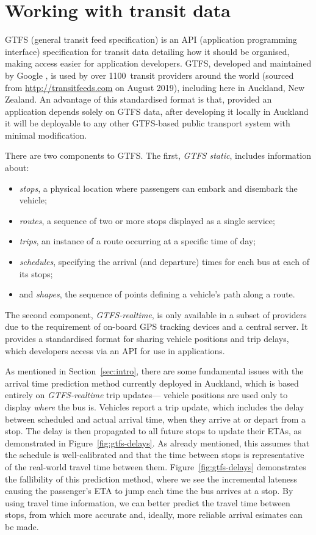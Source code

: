 \section{Working with \rt transit data}
\label{sec:gtfs}


GTFS (general transit feed specification)
is an API (application programming interface) specification for transit data
detailing how it should be organised,
making access easier for application developers.
GTFS, developed and maintained by Google \citep{GoogleDevelopers_2006},
is used by over 1100~transit providers around the world
(sourced from \url{http://transitfeeds.com} on August 2019),
including here in Auckland, New Zealand.
An advantage of this standardised format is that,
provided an application depends solely on GTFS data,
after developing it locally in Auckland it will be deployable to any other GTFS-based
public transport system with minimal modification.


There are two components to GTFS.
The first, \emph{GTFS static}, includes information about:
\begin{itemize}
\item \emph{stops}, a physical location where passengers can embark and disembark the vehicle;
\item \emph{routes}, a sequence of two or more stops displayed as a single service;
\item \emph{trips}, an instance of a route occurring at a specific time of day;
\item \emph{schedules}, specifying the arrival (and departure) times for each bus at each of its stops;
\item and \emph{shapes}, the sequence of points defining a vehicle's path along a route.
\end{itemize}
The second component, \emph{GTFS-realtime},
is only available in a subset of providers due to the requirement of
on-board GPS tracking devices and a central server.
It provides a standardised format for sharing vehicle positions and trip delays,
which developers access via an API for use in \rt applications.

As mentioned in Section~\ref{sec:intro},
there are some fundamental issues with the arrival time prediction method currently
deployed in Auckland,
which is based entirely on \emph{GTFS-realtime} trip updates---%
vehicle positions are used only to display \emph{where} the bus is.
Vehicles report a trip update,
which includes the delay between scheduled and actual arrival time,
when they arrive at or depart from a stop.
The delay is then propagated to all future stops to update their ETAs,
as demonstrated in Figure~\ref{fig:gtfs-delays}.
As already mentioned, this assumes that the schedule is well-calibrated
and that the time between stops
is representative of the real-world travel time between them.
Figure~\ref{fig:gtfs-delays} demonstrates the fallibility of this prediction method,
where we see the incremental lateness causing the passenger's ETA to
jump each time the bus arrives at a stop.
By using \rt travel time information,
we can better predict the travel time between stops,
from which more accurate and, ideally, more reliable arrival esimates
can be made.


